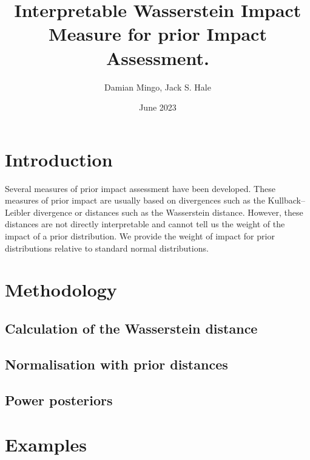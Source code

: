 \documentclass{article}
\title{Interpretable Wasserstein Impact Measure for prior Impact Assessment.}
\author{Damian Mingo, Jack S. Hale}
\date{June 2023}
\begin{document}
\maketitle

\section{Introduction}
Several measures of prior impact assessment have been developed. These measures of prior impact are usually based on divergences such as the Kullback–Leibler divergence or distances such as the Wasserstein distance. However, these distances are not directly interpretable and cannot tell us the weight of the impact of a prior distribution. We provide the weight of impact for prior distributions relative to standard normal distributions.

\section{Methodology}
\subsection{Calculation of the Wasserstein distance}

\subsection{Normalisation with prior distances}

\subsection{Power posteriors}

\section{Examples}
\end{document}
